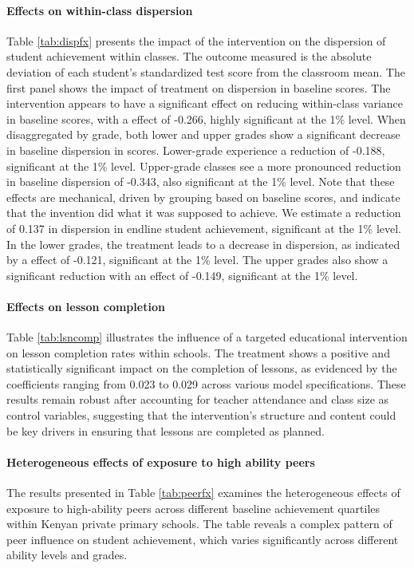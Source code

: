 \documentclass[12pt]{article}
\begin{document}
\paragraph{Effects on within-class dispersion}
Table \ref{tab:dispfx} presents the impact of the intervention on the dispersion of student achievement within classes. The outcome measured is the absolute deviation of each student's standardized test score from the classroom mean. The first panel shows the impact of treatment on dispersion in baseline scores. The intervention appears to have a significant effect on reducing within-class variance in baseline scores, with a effect of -0.266, highly significant at the 1\% level. When disaggregated by grade, both lower and upper grades show a significant decrease in baseline dispersion in scores. Lower-grade experience a reduction of -0.188, significant at the 1\% level. Upper-grade classes see a more pronounced reduction in baseline dispersion of -0.343, also significant at the 1\% level. Note that these effects are mechanical, driven by grouping based on baseline scores, and indicate that the invention did what it was supposed to achieve. We estimate a reduction of 0.137 in dispersion in endline student achievement, significant at the 1\% level. In the lower grades, the treatment leads to a decrease in dispersion, as indicated by a effect of -0.121, significant at the 1\% level. The upper grades also show a significant reduction with an effect of -0.149, significant at the 1\% level.

\paragraph{Effects on lesson completion}
Table \ref{tab:lsncomp} illustrates the influence of a targeted educational intervention on lesson completion rates within schools. The treatment shows a positive and statistically significant impact on the completion of lessons, as evidenced by the coefficients ranging from 0.023 to 0.029 across various model specifications. These results remain robust after accounting for teacher attendance and class size as control variables, suggesting that the intervention's structure and content could be key drivers in ensuring that lessons are completed as planned.

\paragraph{Heterogeneous effects of exposure to high ability peers}
The results presented in Table \ref{tab:peerfx} examines the heterogeneous effects of exposure to high-ability peers across different baseline achievement quartiles within Kenyan private primary schools. The table reveals a complex pattern of peer influence on student achievement, which varies significantly across different ability levels and grades.
\end{document}
